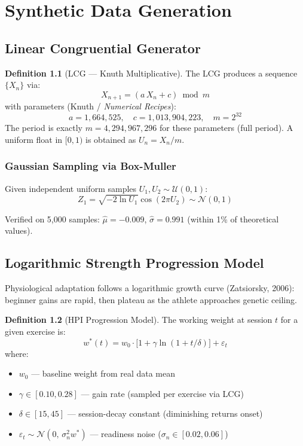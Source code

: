 \documentclass[12pt,a4paper]{report}
\theoremstyle{definition}
\newtheorem{definition}{Definition}[chapter]
\begin{document}
\chapter{Synthetic Data Generation}

\section{Linear Congruential Generator}

\begin{definition}[LCG — Knuth Multiplicative]
The LCG produces a sequence $\{X_n\}$ via:
\[
  X_{n+1} = (a\,X_n + c) \bmod m
\]
with parameters (Knuth / \textit{Numerical Recipes}):
\[
  a = 1{,}664{,}525, \quad c = 1{,}013{,}904{,}223, \quad m = 2^{32}
\]
The period is exactly $m = 4{,}294{,}967{,}296$ for these parameters (full period).
A uniform float in $[0,1)$ is obtained as $U_n = X_n / m$.
\end{definition}

\subsection{Gaussian Sampling via Box-Muller}

Given independent uniform samples $U_1, U_2 \sim \mathcal{U}(0,1)$:
\[
  Z_1 = \sqrt{-2\ln U_1}\cos(2\pi U_2) \sim \mathcal{N}(0,1)
\]

Verified on 5{,}000 samples: $\hat{\mu} = -0.009$, $\hat{\sigma} = 0.991$
(within 1\% of theoretical values).

\section{Logarithmic Strength Progression Model}

Physiological adaptation follows a logarithmic growth curve (Zatsiorsky, 2006):
beginner gains are rapid, then plateau as the athlete approaches genetic ceiling.

\begin{definition}[HPI Progression Model]
The working weight at session $t$ for a given exercise is:
\[
  w^*(t) = w_0 \cdot \bigl[1 + \gamma \ln(1 + t/\delta)\bigr] + \varepsilon_t
\]
where:
\begin{itemize}
  \item $w_0$ — baseline weight from real data mean
  \item $\gamma \in [0.10, 0.28]$ — gain rate (sampled per exercise via LCG)
  \item $\delta \in [15, 45]$ — session-decay constant (diminishing returns onset)
  \item $\varepsilon_t \sim \mathcal{N}(0,\, \sigma_n^2 w^*)$ — readiness noise ($\sigma_n \in [0.02, 0.06]$)
\end{itemize}
\end{definition}
\end{document}
